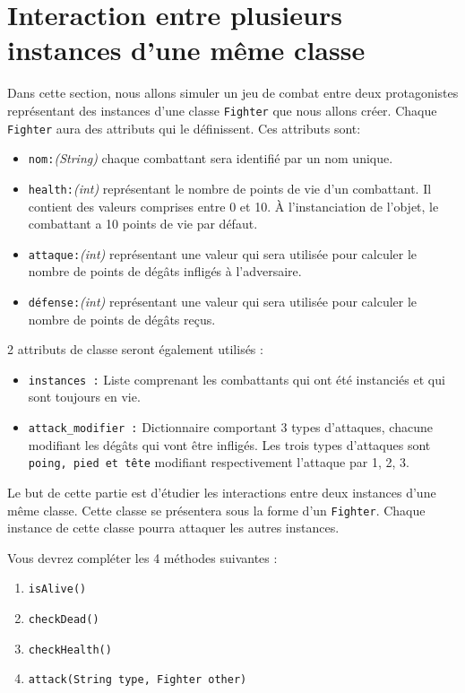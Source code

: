 \section{Interaction entre plusieurs instances d'une même classe}
Dans cette section, nous allons simuler un jeu de combat entre deux protagonistes représentant des instances d'une classe \lstinline{Fighter} que nous allons créer.
Chaque \lstinline{Fighter} aura des attributs qui le définissent. Ces attributs sont:
\begin{itemize}
    \item \lstinline{nom:}\textit{(String)} chaque combattant sera identifié par un nom unique.
    \item \lstinline{health:}\textit{(int)} représentant le nombre de points de vie d'un combattant. Il contient des valeurs comprises entre 0 et 10. À l'instanciation de l'objet, le combattant a 10 points de vie par défaut.
    \item \lstinline{attaque:}\textit{(int)} représentant une valeur qui sera utilisée pour calculer le nombre de points de dégâts infligés à l'adversaire.
    \item \lstinline{défense:}\textit{(int)} représentant une valeur qui sera utilisée pour calculer le nombre de points de dégâts reçus.
\end{itemize}

2 attributs de classe seront également utilisés :
\begin{itemize}
\item \lstinline{instances :} Liste comprenant les combattants qui ont été instanciés et qui sont toujours en vie.
\item \lstinline{attack_modifier :} Dictionnaire comportant 3 types d'attaques, chacune modifiant les dégâts qui vont être infligés. Les trois types d'attaques sont \lstinline{poing, pied et tête} modifiant respectivement l'attaque par 1, 2, 3.
\end{itemize}

Le but de cette partie est d'étudier les interactions entre deux instances d'une même classe. Cette classe se présentera sous la forme d'un \lstinline{Fighter}. Chaque instance de cette classe pourra attaquer les autres instances.

Vous devrez compléter les 4 méthodes suivantes :
\begin{enumerate}
\item \lstinline{isAlive()}
\item \lstinline{checkDead()}
\item \lstinline{checkHealth()}
\item \lstinline{attack(String type, Fighter other)}
\end{enumerate}




